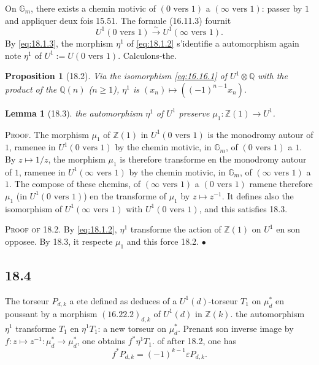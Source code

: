 \documentclass[12pt,a4paper]{article}
\theoremstyle{plain}
\newtheorem{lemma}[theorem]{Lemma}
\newtheorem{proposition}[theorem]{Proposition}
\theoremstyle{definition}
\theoremstyle{remark}
\newcommand{\Gm}{\mathbb{G}_m}
\newcommand{\ZZ}{\mathbb{Z}}
\newcommand{\QQ}{\mathbb{Q}}
\begin{document}
On $\Gm$, there exists a chemin motivic of $(0 \text{ vers } 1)$ a
$(\infty \text{ vers } 1)$: passer by $1$ and appliquer deux fois 15.51.
The formule (16.11.3) fournit
\begin{equation}\label{eq:18.1.3}
U^1(0 \text{ vers } 1) \xrightarrow{\sim} U^1(\infty \text{ vers } 1).
\end{equation}
By \eqref{eq:18.1.3}, the morphism $\eta^1$ of \eqref{eq:18.1.2}
s'identifie a automorphism again note $\eta^1$ of
$U^1 := U(0 \text{ vers } 1)$. Calculons-the.

\begin{proposition}[18.2]\label{prop:18.2}
Via the isomorphism \eqref{eq:16.16.1} of $U^1 \otimes \QQ$ with the
product of the $\QQ(n)$ ($n \geq 1$), $\eta^1$ is
$(x_n) \mapsto ((-1)^{n-1} x_n)$.
\end{proposition}

\begin{lemma}[18.3]\label{lem:18.3}
the automorphism $\eta^1$ of $U^1$ preserve $\mu_1 : \ZZ(1) \to U^1$.
\end{lemma}

\noindent \textsc{Proof.} The morphism $\mu_1$ of $\ZZ(1)$ in
$U^1(0 \text{ vers } 1)$ is the monodromy autour of $1$, ramenee in
$U^1(0 \text{ vers } 1)$ by the chemin motivic, in $\Gm$, of
$(0 \text{ vers } 1)$ a $1$. By $z \mapsto 1/z$, the morphism
$\mu_1$ is therefore transforme en the monodromy autour of $1$, ramenee
in $U^1(\infty \text{ vers } 1)$ by the chemin motivic, in $\Gm$,
of $(\infty \text{ vers } 1)$ a $1$. The compose of these chemins, of
$(\infty \text{ vers } 1)$ a $(0 \text{ vers } 1)$ ramene therefore $\mu_1$
(in $U^1(0 \text{ vers } 1)$) en the transforme of $\mu_1$ by
$z \mapsto z^{-1}$. It defines also the isomorphism of
$U^1(\infty \text{ vers } 1)$ with $U^1(0 \text{ vers } 1)$, and this
satisfies 18.3.

\noindent \textsc{Proof of 18.2.} By \eqref{eq:18.1.2}, $\eta^1$
transforme the action of $\ZZ(1)$ on $U^1$ en son opposee. By 18.3,
it respecte $\mu_1$ and this force 18.2. \hfill $\bullet$

\subsection{18.4}

The torseur $P_{d,k}$ a ete defined as deduces of a $U^1(d)$-torseur
$T_1$ on $\mu_d^*$ en poussant by a morphism
$(16.22.2)_{d,k}$ of $U^1(d)$ in $\ZZ(k)$. the automorphism
$\eta^1$ transforme $T_1$ en $\eta^1 T_1$: a new torseur on
$\mu_d^*$. Prenant son inverse image by
$f : z \mapsto z^{-1} : \mu_d^* \to \mu_d^*$, one obtains
$f^*\eta^1 T_1$. of after 18.2, one has
\[
f^*P_{d,k} = (-1)^{k-1} \varepsilon P_{d,k}.
\]
\end{document}
